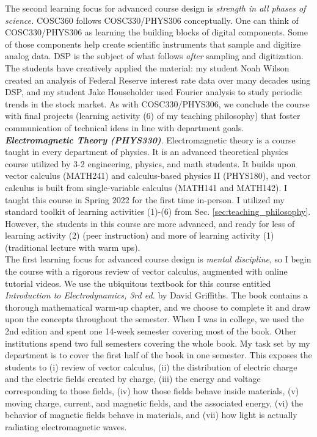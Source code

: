 \documentclass[../../../main.tex]{subfiles}
\begin{document}
The second learning focus for advanced course design is \textit{strength in all phases of science.}  COSC360 follows COSC330/PHYS306 conceptually.  One can think of COSC330/PHYS306 as learning the building blocks of digital components.  Some of those components help create scientific instruments that sample and digitize analog data.  DSP is the subject of what follows \textit{after} sampling and digitization.  The students have creatively applied the material: my student Noah Wilson created an analysis of Federal Reserve interest rate data over many decades using DSP, and my student Jake Householder used Fourier analysis to study periodic trends in the stock market.  As with COSC330/PHYS306, we conclude the course with final projects (learning activity (6) of my teaching philosophy) that foster communication of technical ideas in line with department goals.
\\
\vspace{0.15cm}
\textbf{\textit{Electromagnetic Theory (PHYS330)}}.  Electromagnetic theory is a course taught in every department of physics.  It is an advanced theoretical physics course utilized by 3-2 engineering, physics, and math students.  It builds upon vector calculus (MATH241) and calculus-based physics II (PHYS180), and vector calculus is built from single-variable calculus (MATH141 and MATH142).  I taught this course in Spring 2022 for the first time in-person.  I utilized my standard toolkit of learning activities (1)-(6) from Sec. \ref{sec:teaching_philosophy}.  However, the students in this course are more advanced, and ready for less of learning activity (2) (peer instruction) and more of learning activity (1) (traditional lecture with warm ups).
\\
\vspace{0.15cm}
The first learning focus for advanced course design is \textit{mental discipline}, so I begin the course with a rigorous review of vector calculus, augmented with online tutorial videos.  We use the ubiquitous textbook for this course entitled \textit{Introduction to Electrodynamics, 3rd ed.} by David Griffiths.  The book contains a thorough mathematical warm-up chapter, and we choose to complete it and draw upon the concepts throughout the semester.  When I was in college, we used the 2nd edition and spent one 14-week semester covering most of the book.  Other institutions spend two full semesters covering the whole book.  My task set by my department is to cover the first half of the book in one semester.  This exposes the students to (i) review of vector calculus, (ii) the distribution of electric charge and the electric fields created by charge, (iii) the energy and voltage corresponding to those fields, (iv) how those fields behave inside materials, (v) moving charge, current, and magnetic fields, and the associated energy, (vi) the behavior of magnetic fields behave in materials, and (vii) how light is actually radiating electromagnetic waves.
\end{document}
